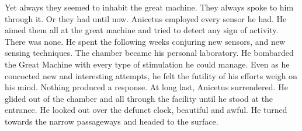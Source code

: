\documentclass[a4paper]{article}
\begin{document}
Yet always they seemed to inhabit the great machine. They always spoke to him through it. Or they had until now.
Anicetus employed every sensor he had. He aimed them all at the great machine and tried to detect any sign of activity. There was none.
He spent the following weeks conjuring new sensors, and new sensing techniques. The chamber became his personal laboratory. He bombarded the Great Machine with every type of stimulation he could manage. Even as he concocted new and interesting attempts, he felt the futility of his efforts weigh on his mind. Nothing produced a response. At long last, Anicetus surrendered.
He glided out of the chamber and all through the facility until he stood at the entrance. He looked out over the defunct clock, beautiful and awful. He turned towards the narrow passageways and headed to the surface.
\end{document}
